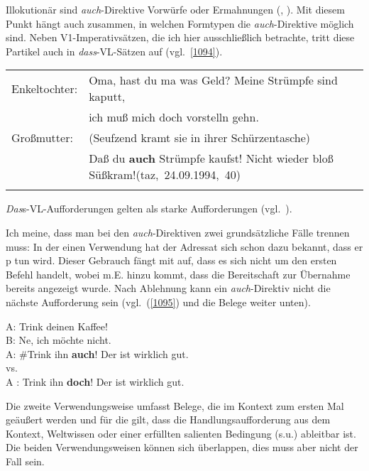 Illokutionär sind \textit{auch}-Direktive Vorwürfe  oder  Ermahnungen (\citealt[58]{Dahl1988}, \citealt[78]{Kwon2005}). Mit diesem Punkt hängt auch zusammen, in welchen Formtypen die \textit{auch}-Direktive möglich sind. Neben V1-Imperativsätzen, die ich hier aus\-schließlich betrachte, tritt diese Partikel auch in \textit{dass}-VL-Sätzen auf (vgl.\ \ref{1094}).

\begin{exe}
	\ex\label{1094} 
    \begin{tabularx}{\linewidth}[t]{@{}lX@{}}
	Enkeltochter: & Oma, hast du ma was Geld? Meine Strümpfe sind kaputt, \\
	& ich muß mich doch vorstelln gehn.\\
	Großmutter: & (Seufzend kramt sie in ihrer Schürzentasche) \\
	& Daß du \textbf{auch} Strümpfe kaufst! Nicht wieder bloß Süßkram!\hbox{}\hfill\hbox{(taz, 24.09.1994, 40)}\\
	& \hfill\hbox{\citet[78]{Kwon2005}}				       
	\end{tabularx}
\end{exe}
\textit{Das}s-VL-Aufforderungen gelten als starke Aufforderungen (vgl.\ \citealt[54]{Thurmair1989}). 

Ich meine, dass man bei den \textit{auch}-Direktiven zwei grundsätzliche Fälle trennen muss: In der einen Verwendung hat der Adressat sich schon dazu bekannt, dass er p tun wird. Dieser Gebrauch fängt mit auf, dass es sich nicht um den ersten Befehl handelt, wobei m.E. hinzu kommt, dass die Bereitschaft zur Übernahme bereits angezeigt wurde. Nach Ablehnung kann ein \textit{auch}-Direktiv nicht die nächste Aufforderung sein (vgl.\ (\ref{1095}) und die Belege weiter unten).

\begin{exe}
	\ex\label{1095} 
 	A: Trink deinen Kaffee!\\
	B: Ne, ich möchte nicht.\\
	A: \#Trink ihn \textbf{auch}! Der ist wirklich gut.\\
	vs.\\
	A : Trink ihn \textbf{doch}! Der ist wirklich gut.
\end{exe}
Die zweite Verwendungsweise umfasst Belege, die im Kontext zum ersten Mal geäußert werden und für die gilt, dass die Handlungsaufforderung aus dem Kontext, Weltwissen oder einer erfüllten salienten Bedingung (s.u.) ableitbar ist. Die beiden Verwendungsweisen können sich überlappen, dies muss aber nicht der Fall sein.

